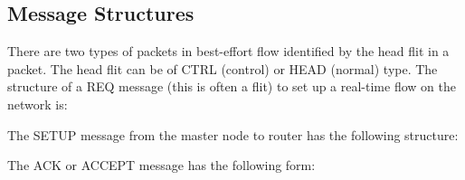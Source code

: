 \documentclass[conference, twocolumn]{IEEEtran}
\theoremstyle{definition}
\begin{document}
\subsection{Message Structures}

There are two types of packets in best-effort flow identified by the head flit
in a packet. The head flit can be of CTRL (control) or HEAD (normal) type. The
structure of a REQ message (this is often a flit) to set up a real-time flow on the network is:

\begin{table}[htbp]
\begin{center}
\end{center}
\caption{REQ path message}
\label{table:PathMsg}
\end{table}

The SETUP message from the master node to router has the following structure:

\begin{table}[htbp]
\begin{center}
\end{center}
\caption{SETUP path message}
\label{table:PathMsg}
\end{table}

The ACK or ACCEPT message has the following form:


\begin{table}[htbp]
\begin{center}
\end{center}
\caption{SETUP path message}
\label{table:PathMsg}
\end{table}
\end{document}
